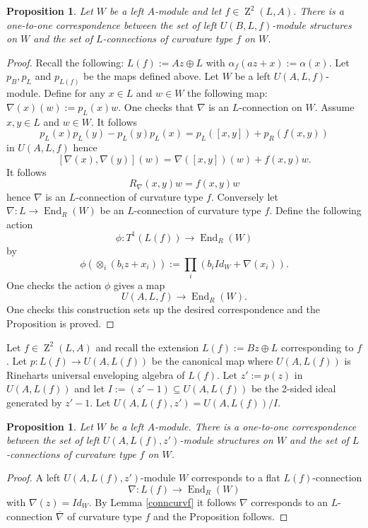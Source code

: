 \documentclass{amsart}
\theoremstyle{plain}
\newtheorem{proposition}[theorem]{Proposition}
\theoremstyle{definition}
\theoremstyle{remark}
\numberwithin{equation}{theorem}
\begin{document}
\begin{proposition} \label{fmodules}Let $W$ be a left ${A}$-module and let $f\in {\operatorname{Z}}^2(L,{A})$.
There is a one-to-one correspondence between the set of left $U(B,L,f)$-module
structures on $W$ and the set of $L$-connections of curvature type $f$ on $W$.
\end{proposition}
\begin{proof} Recall the following: $L(f):={A} z\oplus L$ with $\alpha_f(az+x):=\alpha(x)$. Let
${p_B}, {p_L}$ and ${p_{L(f)}}$ be the maps defined above.
Let $W$ be a left $U({A},L,f)$-module. Define for any $x\in L$ and $w\in W$ the following
map: $\nabla(x)(w):={p_L}(x)w$. One checks that $\nabla$ is an $L$-connection on $W$. Assume $x,y\in L$ and $w\in W$.
It follows 
\[ {p_L}(x){p_L}(y)-{p_L}(y){p_L}(x)={p_L}([x,y])+p_{R}(f(x,y)) \]
in $U({A},L,f)$ hence
\[   [\nabla(x),\nabla(y)](w)=\nabla([x,y])(w)+f(x,y)w .\]
It follows 
\[ R_\nabla(x,y)w=f(x,y)w\]
hence $\nabla$ is an $L$-connection of curvature type $f$.
Conversely let $\nabla:L\rightarrow {\operatorname{End} }_{R}(W)$ be an $L$-connection of curvature type $f$.
Define the following action
\[\phi : T^1(L(f)) \rightarrow {\operatorname{End} }_{R}(W) \]
by
\[\phi(\otimes_i (b_iz+x_i)):=\prod_i (b_iId_W+\nabla(x_i)).\]
One checks the action $\phi$ gives a map
\[ U({A},L,f) \rightarrow {\operatorname{End} }_{R}(W) .\]
One checks this construction sets up the desired correspondence and the Proposition is proved.
\end{proof}

Let $f\in {\operatorname{Z}}^2(L,{A})$ and recall the extension $L(f):=Bz\oplus L$ corresponding to $f$. Let 
$p:L(f)\rightarrow U({A},L(f))$ be the canonical map where $U({A},L(f))$ is Rineharts universal enveloping algebra
of $L(f)$. Let $z':=p(z)$ in $U({A},L(f))$ and let $I:=(z'-1)\subseteq U({A},L(f))$ be the 2-sided ideal generated by 
$z'-1$.  Let $U({A},L(f),z')=U({A},L(f))/I$.

\begin{proposition} \label{lconnf} Let $W$ be a left ${A}$-module.
There is a one-to-one correspondence between the set of left $U({A},L(f),z')$-module structures on $W$  and the set of
$L$-connections of curvature type $f$ on $W$.
\end{proposition}
\begin{proof} A left $U({A},L(f),z')$-module $W$ corresponds to a flat $L(f)$-connection
\[ {\nabla}:L(f)\rightarrow {\operatorname{End} }_{R}(W)\]
with ${\nabla}(z)=Id_W$. By Lemma \ref{conncurvf} it follows ${\nabla}$ corresponds to an $L$-connection ${\overline{\nabla}}$ of curvature type $f$
and the Proposition follows.
\end{proof}
\end{document}

